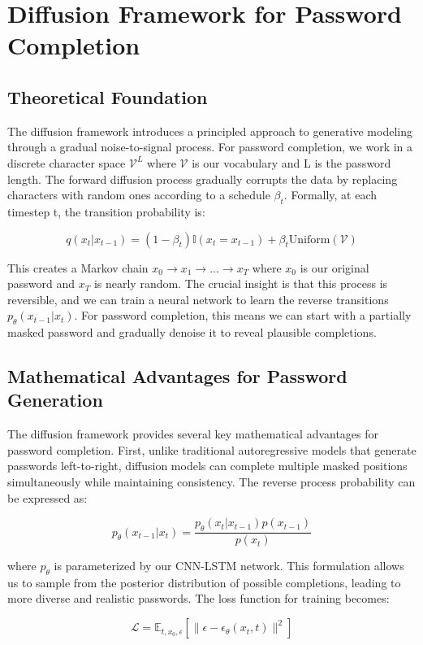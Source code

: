 \section{Diffusion Framework for Password Completion}

\subsection{Theoretical Foundation}
The diffusion framework introduces a principled approach to generative modeling through a gradual noise-to-signal process. For password completion, we work in a discrete character space $\mathcal{V}^L$ where $\mathcal{V}$ is our vocabulary and L is the password length. The forward diffusion process gradually corrupts the data by replacing characters with random ones according to a schedule $\beta_t$. Formally, at each timestep t, the transition probability is:

$$q(x_t|x_{t-1}) = (1-\beta_t)\mathbb{I}(x_t = x_{t-1}) + \beta_t\text{Uniform}(\mathcal{V})$$

This creates a Markov chain $x_0 \rightarrow x_1 \rightarrow ... \rightarrow x_T$ where $x_0$ is our original password and $x_T$ is nearly random. The crucial insight is that this process is reversible, and we can train a neural network to learn the reverse transitions $p_\theta(x_{t-1}|x_t)$. For password completion, this means we can start with a partially masked password and gradually denoise it to reveal plausible completions.

\subsection{Mathematical Advantages for Password Generation}
The diffusion framework provides several key mathematical advantages for password completion. First, unlike traditional autoregressive models that generate passwords left-to-right, diffusion models can complete multiple masked positions simultaneously while maintaining consistency. The reverse process probability can be expressed as:

$$p_\theta(x_{t-1}|x_t) = \frac{p_\theta(x_t|x_{t-1})p(x_{t-1})}{p(x_t)}$$

where $p_\theta$ is parameterized by our CNN-LSTM network. This formulation allows us to sample from the posterior distribution of possible completions, leading to more diverse and realistic passwords. The loss function for training becomes:

$$\mathcal{L} = \mathbb{E}_{t,x_0,\epsilon}[\|\epsilon - \epsilon_\theta(x_t, t)\|^2]$$

